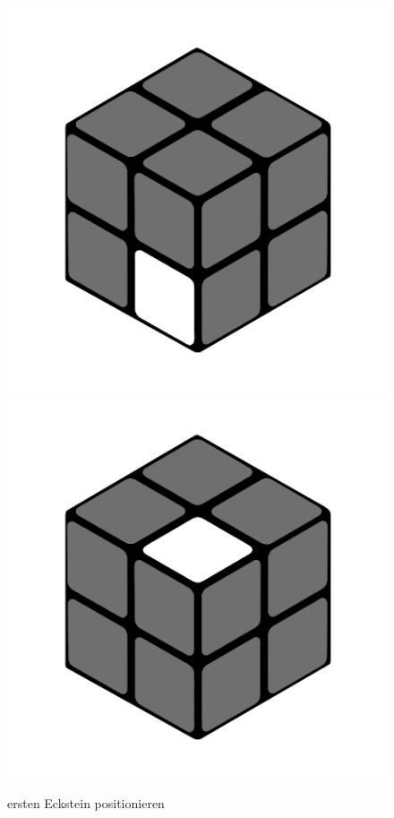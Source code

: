 \documentclass[12pt,a4paper, usenames, dvipsnames]{article}
\theoremstyle{mystyle}
\theoremstyle{definition}
\begin{document}
\begin{figure}[H]
\centering
\includegraphics[scale=0.1]{e1_s1_s1.png}
\includegraphics[scale=0.1]{e1_s1_s2.png}
\caption{ersten Eckstein positionieren}
\label{30}
\end{figure}
\end{document}
